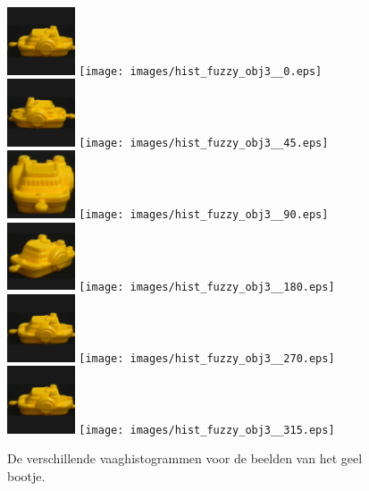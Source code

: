 \begin{figure}[bp]
\caption{\label{fig:alle_vaaghistn_geel_bootje}De verschillende vaaghistogrammen voor de beelden 
van het geel bootje.}
\vspace{5pt}
\centering
\includegraphics[height=2cm]{coil/beeld-12.eps}
\texttt{[image: images/hist\_fuzzy\_obj3\_\_0.eps]}\hspace{1cm}
\includegraphics[height=2cm]{coil/beeld-13.eps}
\texttt{[image: images/hist\_fuzzy\_obj3\_\_45.eps]}\\[5pt]
\includegraphics[height=2cm]{coil/beeld-14.eps}
\texttt{[image: images/hist\_fuzzy\_obj3\_\_90.eps]}\hspace{1cm}
\includegraphics[height=2cm]{coil/beeld-15.eps}
\texttt{[image: images/hist\_fuzzy\_obj3\_\_180.eps]}\\[5pt]
\includegraphics[height=2cm]{coil/beeld-12.eps}
\texttt{[image: images/hist\_fuzzy\_obj3\_\_270.eps]}\hspace{1cm}
\includegraphics[height=2cm]{coil/beeld-12.eps}
\texttt{[image: images/hist\_fuzzy\_obj3\_\_315.eps]}
\vspace{5pt}
\end{figure}

